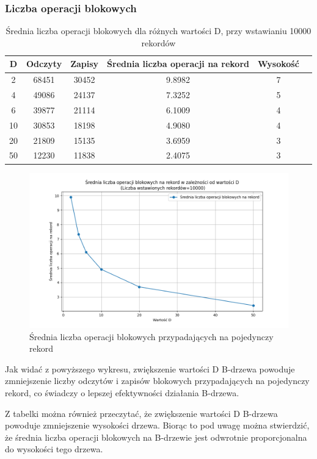 \documentclass[12pt]{article}
\begin{document}
\subsubsection{Liczba operacji blokowych}
\begin{table}[H]
\centering
\caption{Średnia liczba operacji blokowych dla różnych wartości D, przy wstawianiu 10000 rekordów}
\begin{tabular}{|c|c|c|c|c|c|}
\hline
D & Odczyty & Zapisy & Średnia liczba operacji na rekord & Wysokość \\
\hline
2 & 68451 & 30452 & 9.8982 & 7 \\
4 & 49086 & 24137 & 7.3252 & 5 \\
6 & 39877 & 21114 & 6.1009 & 4 \\
10 & 30853 & 18198 & 4.9080 & 4 \\
20 & 21809 & 15135 & 3.6959 & 3 \\
50 & 12230 & 11838 & 2.4075 & 3 \\
\hline
\end{tabular}
\end{table}

\begin{figure}[H]
    \centering
    \includegraphics[width=\textwidth]{../Plots/block_operations_per_record.png}
    \caption{Średnia liczba operacji blokowych przypadających na pojedynczy rekord}
    \label{fig:plot1}
\end{figure}

Jak widać z powyższego wykresu, zwiększenie wartości D B-drzewa powoduje 
zmniejszenie liczby odczytów i zapisów blokowych przypadających na pojedynczy rekord, 
co świadczy o lepszej efektywności działania B-drzewa.

Z tabelki można również przeczytać, że zwiększenie wartości D B-drzewa 
powoduje zmniejszenie wysokości drzewa.
Biorąc to pod uwagę można stwierdzić, że średnia liczba operacji blokowych na B-drzewie
jest odwrotnie proporcjonalna do wysokości tego drzewa.
\end{document}
